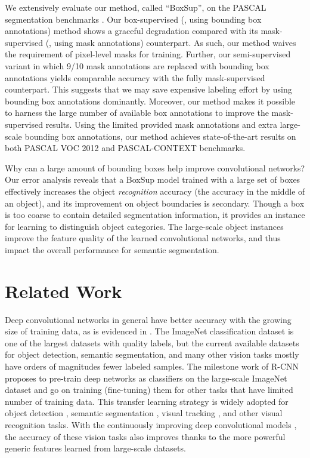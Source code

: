 \documentclass[10pt,twocolumn,letterpaper]{article}
\begin{document}
We extensively evaluate our method, called ``BoxSup'', on the PASCAL segmentation benchmarks \cite{everingham2010pascal,mottaghi2014role}. Our box-supervised (\ie, using bounding box annotations) method shows a graceful degradation compared with its mask-supervised (\ie, using mask annotations) counterpart. As such, our method waives the requirement of pixel-level masks for training.
Further, our semi-supervised variant in which 9/10 mask annotations are replaced with bounding box annotations yields comparable accuracy with the fully mask-supervised counterpart.
This suggests that we may save expensive labeling effort by using bounding box annotations dominantly.
Moreover, our method makes it possible to harness the large number of available box annotations to improve the mask-supervised results.
Using the limited provided mask annotations and extra large-scale bounding box annotations,
our method achieves state-of-the-art results on both PASCAL VOC 2012 and PASCAL-CONTEXT \cite{mottaghi2014role} benchmarks.

Why can a large amount of bounding boxes help improve convolutional networks? Our error analysis reveals that a BoxSup model trained with a large set of boxes effectively increases the object \emph{recognition} accuracy (the accuracy in the middle of an object), and its improvement on object boundaries is secondary. Though a box is too coarse to contain detailed segmentation information, it provides an instance for learning to distinguish object categories.
The large-scale object instances improve the feature quality of the learned convolutional networks, and thus impact the overall performance for semantic segmentation.

\section{Related Work}

Deep convolutional networks in general have better accuracy with the growing size of training data, as is evidenced in \cite{krizhevsky2012imagenet,Zeiler2014}.
The ImageNet classification dataset \cite{Russakovsky2014} is one of the largest datasets with quality labels, but the current available datasets for object detection, semantic segmentation, and many other vision tasks mostly have orders of magnitudes fewer labeled samples. The milestone work of R-CNN \cite{Girshick2014} proposes to pre-train deep networks as classifiers on the large-scale ImageNet dataset and go on training (fine-tuning) them for other tasks that have limited number of training data. This transfer learning strategy is widely adopted for object detection \cite{Girshick2014,He2014,Szegedy2015}, semantic segmentation \cite{hariharan2014simultaneous,Long2015,Hariharan2015,Dai2015,Chen2015,mostajabi2014feedforward},
visual tracking \cite{Wang2015}, and other visual recognition tasks. With the continuously improving deep convolutional models \cite{Zeiler2014,Sermanet2014,Chatfield2014,He2014,Simonyan2015,Szegedy2015,He2015}, the accuracy of these vision tasks also improves thanks to the more powerful generic features learned from large-scale datasets.
\end{document}
